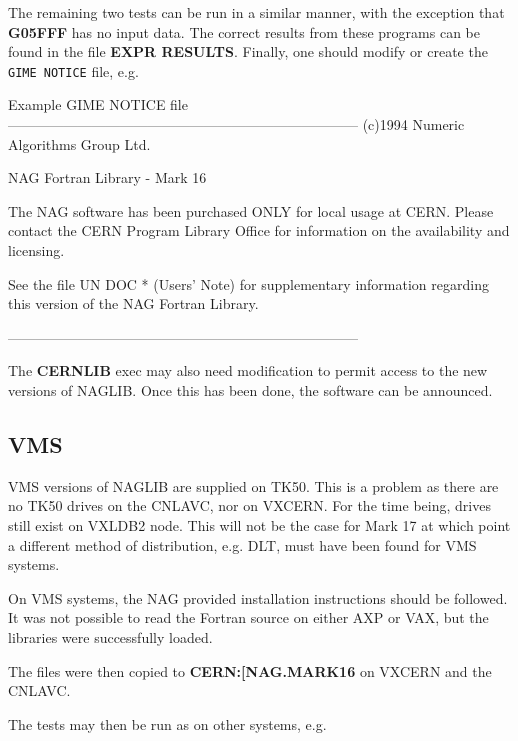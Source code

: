 The remaining two tests can be run in a similar manner, with the exception
that {\bf G05FFF} has no input data. The correct results from these programs
can be found in the file {\bf EXPR RESULTS}.
Finally, one should modify or create the {\tt GIME NOTICE} file, e.g.

\begin{XMPt}{Example GIME NOTICE file}
---------------------------------------------------------------------------
 (c)1994 Numeric Algorithms Group Ltd.
 
         NAG Fortran Library - Mark 16
 
         The NAG software has been purchased ONLY for local usage at CERN.
         Please contact the CERN Program Library Office for information on
         the availability and licensing.
 
See the file UN DOC * (Users' Note) for supplementary information
regarding this version of the NAG Fortran Library.
 
---------------------------------------------------------------------------
\end{XMPt}

The {\bf CERNLIB} exec may also need modification to permit access to the
new versions of NAGLIB. Once this has been done, the software can be announced.

\subsection{VMS}

VMS versions of NAGLIB are supplied on TK50. This is a problem as there
are no TK50 drives on the CNLAVC, nor on VXCERN. For the time being,
drives still exist on VXLDB2 node. This will not be the case for Mark 17
at which point a different method of distribution, e.g. DLT, must have
been found for VMS systems.

On VMS systems, the NAG provided installation instructions should be
followed. It was not possible to read the Fortran source on either
AXP or VAX, but the libraries were successfully loaded.

The files were then copied to {\bf CERN:[NAG.MARK16} on VXCERN
and the CNLAVC.

The tests may then be run as on other systems, e.g.

